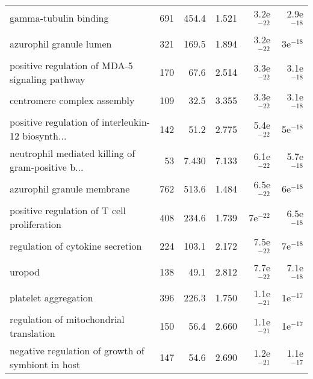 \begin{longtable}{lrrrrr}
                             gamma-tubulin binding &                     691 &                   454.4 &      1.521 &         3.2e$^{-22}$ &         2.9e$^{-18}$ \\
                           azurophil granule lumen &                     321 &                   169.5 &      1.894 &         3.2e$^{-22}$ &           3e$^{-18}$ \\
    positive regulation of MDA-5 signaling pathway &                     170 &                    67.6 &      2.514 &         3.3e$^{-22}$ &         3.1e$^{-18}$ \\
                       centromere complex assembly &                     109 &                    32.5 &      3.355 &         3.3e$^{-22}$ &         3.1e$^{-18}$ \\
 positive regulation of interleukin-12 biosynth... &                     142 &                    51.2 &      2.775 &         5.4e$^{-22}$ &           5e$^{-18}$ \\
 neutrophil mediated killing of gram-positive b... &                      53 &                   7.430 &      7.133 &         6.1e$^{-22}$ &         5.7e$^{-18}$ \\
                        azurophil granule membrane &                     762 &                   513.6 &      1.484 &         6.5e$^{-22}$ &           6e$^{-18}$ \\
       positive regulation of T cell proliferation &                     408 &                   234.6 &      1.739 &           7e$^{-22}$ &         6.5e$^{-18}$ \\
                  regulation of cytokine secretion &                     224 &                   103.1 &      2.172 &         7.5e$^{-22}$ &           7e$^{-18}$ \\
                                            uropod &                     138 &                    49.1 &      2.812 &         7.7e$^{-22}$ &         7.1e$^{-18}$ \\
                              platelet aggregation &                     396 &                   226.3 &      1.750 &         1.1e$^{-21}$ &           1e$^{-17}$ \\
           regulation of mitochondrial translation &                     150 &                    56.4 &      2.660 &         1.1e$^{-21}$ &           1e$^{-17}$ \\
 negative regulation of growth of symbiont in host &                     147 &                    54.6 &      2.690 &         1.2e$^{-21}$ &         1.1e$^{-17}$ \\

\end{longtable}
